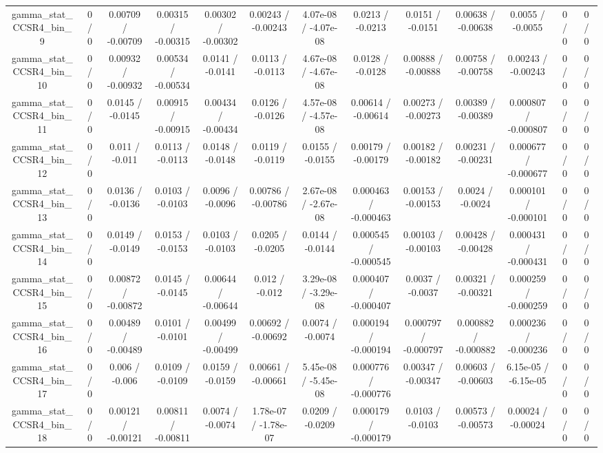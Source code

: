 \documentclass[10pt]{article}
\begin{document}
\begin{table}[htbp]
\begin{center}
\begin{tabular}{|c|c|c|c|c|c|c|c|c|c|c|c|c|}
  gamma_stat_CCSR4_bin_9 & 0 / 0 & 0.00709 / -0.00709 & 0.00315 / -0.00315 & 0.00302 / -0.00302 & 0.00243 / -0.00243 & 4.07e-08 / -4.07e-08 & 0.0213 / -0.0213 & 0.0151 / -0.0151 & 0.00638 / -0.00638 & 0.0055 / -0.0055 & 0 / 0 & 0 / 0 \\ 
  gamma_stat_CCSR4_bin_10 & 0 / 0 & 0.00932 / -0.00932 & 0.00534 / -0.00534 & 0.0141 / -0.0141 & 0.0113 / -0.0113 & 4.67e-08 / -4.67e-08 & 0.0128 / -0.0128 & 0.00888 / -0.00888 & 0.00758 / -0.00758 & 0.00243 / -0.00243 & 0 / 0 & 0 / 0 \\ 
  gamma_stat_CCSR4_bin_11 & 0 / 0 & 0.0145 / -0.0145 & 0.00915 / -0.00915 & 0.00434 / -0.00434 & 0.0126 / -0.0126 & 4.57e-08 / -4.57e-08 & 0.00614 / -0.00614 & 0.00273 / -0.00273 & 0.00389 / -0.00389 & 0.000807 / -0.000807 & 0 / 0 & 0 / 0 \\ 
  gamma_stat_CCSR4_bin_12 & 0 / 0 & 0.011 / -0.011 & 0.0113 / -0.0113 & 0.0148 / -0.0148 & 0.0119 / -0.0119 & 0.0155 / -0.0155 & 0.00179 / -0.00179 & 0.00182 / -0.00182 & 0.00231 / -0.00231 & 0.000677 / -0.000677 & 0 / 0 & 0 / 0 \\ 
  gamma_stat_CCSR4_bin_13 & 0 / 0 & 0.0136 / -0.0136 & 0.0103 / -0.0103 & 0.0096 / -0.0096 & 0.00786 / -0.00786 & 2.67e-08 / -2.67e-08 & 0.000463 / -0.000463 & 0.00153 / -0.00153 & 0.0024 / -0.0024 & 0.000101 / -0.000101 & 0 / 0 & 0 / 0 \\ 
  gamma_stat_CCSR4_bin_14 & 0 / 0 & 0.0149 / -0.0149 & 0.0153 / -0.0153 & 0.0103 / -0.0103 & 0.0205 / -0.0205 & 0.0144 / -0.0144 & 0.000545 / -0.000545 & 0.00103 / -0.00103 & 0.00428 / -0.00428 & 0.000431 / -0.000431 & 0 / 0 & 0 / 0 \\ 
  gamma_stat_CCSR4_bin_15 & 0 / 0 & 0.00872 / -0.00872 & 0.0145 / -0.0145 & 0.00644 / -0.00644 & 0.012 / -0.012 & 3.29e-08 / -3.29e-08 & 0.000407 / -0.000407 & 0.0037 / -0.0037 & 0.00321 / -0.00321 & 0.000259 / -0.000259 & 0 / 0 & 0 / 0 \\ 
  gamma_stat_CCSR4_bin_16 & 0 / 0 & 0.00489 / -0.00489 & 0.0101 / -0.0101 & 0.00499 / -0.00499 & 0.00692 / -0.00692 & 0.0074 / -0.0074 & 0.000194 / -0.000194 & 0.000797 / -0.000797 & 0.000882 / -0.000882 & 0.000236 / -0.000236 & 0 / 0 & 0 / 0 \\ 
  gamma_stat_CCSR4_bin_17 & 0 / 0 & 0.006 / -0.006 & 0.0109 / -0.0109 & 0.0159 / -0.0159 & 0.00661 / -0.00661 & 5.45e-08 / -5.45e-08 & 0.000776 / -0.000776 & 0.00347 / -0.00347 & 0.00603 / -0.00603 & 6.15e-05 / -6.15e-05 & 0 / 0 & 0 / 0 \\ 
  gamma_stat_CCSR4_bin_18 & 0 / 0 & 0.00121 / -0.00121 & 0.00811 / -0.00811 & 0.0074 / -0.0074 & 1.78e-07 / -1.78e-07 & 0.0209 / -0.0209 & 0.000179 / -0.000179 & 0.0103 / -0.0103 & 0.00573 / -0.00573 & 0.00024 / -0.00024 & 0 / 0 & 0 / 0 \\ 

\end{tabular}
\end{center}
\end{table}
\end{document}
